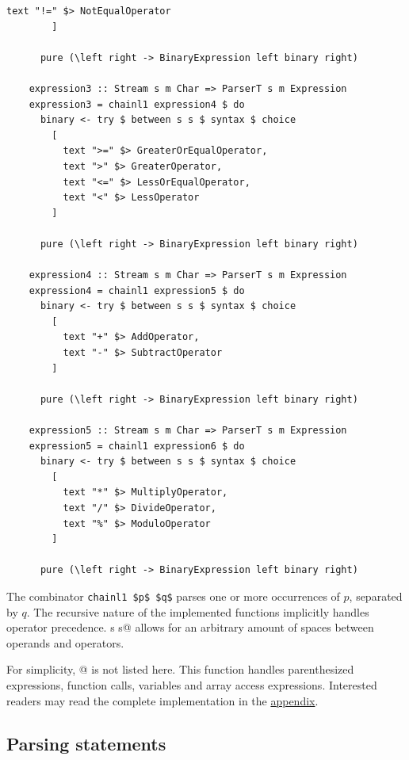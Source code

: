 \documentclass[UdineBachThesis,american,11pt]{PhdThesis}
\begin{document}
  \newpage

  \begin{lstlisting}[gobble=4,basicstyle=\ttfamily\small]
          text "!=" $> NotEqualOperator
        ]

      pure (\left right -> BinaryExpression left binary right)

    expression3 :: Stream s m Char => ParserT s m Expression
    expression3 = chainl1 expression4 $ do
      binary <- try $ between s s $ syntax $ choice
        [
          text ">=" $> GreaterOrEqualOperator,
          text ">" $> GreaterOperator,
          text "<=" $> LessOrEqualOperator,
          text "<" $> LessOperator
        ]

      pure (\left right -> BinaryExpression left binary right)

    expression4 :: Stream s m Char => ParserT s m Expression
    expression4 = chainl1 expression5 $ do
      binary <- try $ between s s $ syntax $ choice
        [
          text "+" $> AddOperator,
          text "-" $> SubtractOperator
        ]

      pure (\left right -> BinaryExpression left binary right)

    expression5 :: Stream s m Char => ParserT s m Expression
    expression5 = chainl1 expression6 $ do
      binary <- try $ between s s $ syntax $ choice
        [
          text "*" $> MultiplyOperator,
          text "/" $> DivideOperator,
          text "%" $> ModuloOperator
        ]

      pure (\left right -> BinaryExpression left binary right)
  \end{lstlisting}

  The combinator \lstinline[mathescape]@chainl1 $p$ $q$@ parses one or more
  occurrences of $p$, separated by $q$. The recursive nature of the implemented
  functions implicitly handles operator precedence. \lstinline@between s s@
  allows for an arbitrary amount of spaces between operands and operators.

  For simplicity, @ is not listed here. This function
  handles parenthesized expressions, function calls, variables and array access
  expressions. Interested readers may read the complete implementation in the
  \hyperref[chapter:devin-source-code]{appendix}.

  \newpage

  \subsection{Parsing statements}
\end{document}
